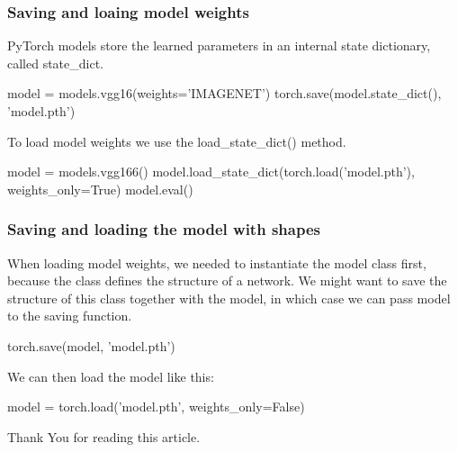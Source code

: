 \documentclass[12pt,hyperref,a4paper,UTF8]{article}
\begin{document}
\subsubsection{Saving and loaing model weights}
\textbf{} PyTorch models store the learned parameters in an internal state dictionary, called state\_dict.
\begin{python}
    model = models.vgg16(weights='IMAGENET')
    torch.save(model.state_dict(), 'model.pth')
\end{python}

\textbf{} To load model weights we use the load\_state\_dict() method.
\begin{python}
    model = models.vgg166()
    model.load_state_dict(torch.load('model.pth'), weights_only=True)
    model.eval()
\end{python}

\subsubsection{Saving and loading the model with shapes}
\textbf{} When loading model weights, we needed to instantiate the model class first, because the class defines the structure of a network. We might want to save the structure of this class together with the model, in which case we can pass model to the saving function.
\begin{python}
    torch.save(model, 'model.pth')
\end{python}

\textbf{} We can then load the model like this:
\begin{python}
    model = torch.load('model.pth', weights_only=False)
\end{python}

\newpage 
\centering
Thank You for reading this article. 
\end{document}
